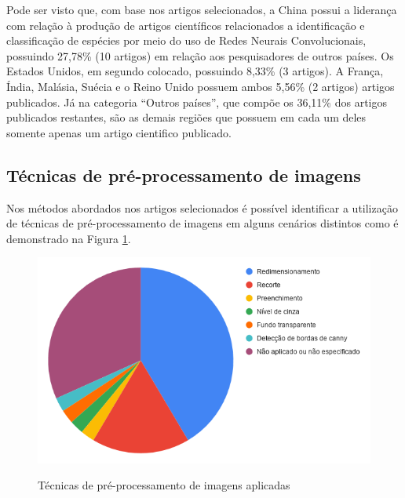 \documentclass[
	12pt,				%
	oneside,			%
	a4paper,			%
	english,			%
	brazil				%
	]{abntex2ppgsi}
\begin{document}
Pode ser visto que, com base nos artigos selecionados, a China possui a liderança com relação à produção de artigos científicos relacionados a identificação e classificação de espécies por meio do uso de Redes Neurais Convolucionais, possuindo 27,78\% (10 artigos) em relação aos pesquisadores de outros países. Os Estados Unidos, em segundo colocado, possuindo 8,33\% (3 artigos). A França, Índia, Malásia, Suécia e o Reino Unido possuem ambos 5,56\% (2 artigos) artigos publicados. Já na categoria ``Outros países'', que compõe os 36,11\% dos artigos publicados restantes, são as demais regiões que possuem em cada um deles somente apenas um artigo cientifico publicado.

\subsection{Técnicas de pré-processamento de imagens}
Nos métodos abordados nos artigos selecionados é possível identificar a utilização de técnicas de pré-processamento de imagens em alguns cenários distintos como é demonstrado na Figura \ref{fig:grafico_preprocessamento_vs_uso}.

\begin{figure}[H]
    \centering
    \caption{Técnicas de pré-processamento de imagens aplicadas}
    \includegraphics[scale=.60]{imagens/revisao_sistematica/grafico_preprocessamento_vs_uso.png}
    \label{fig:grafico_preprocessamento_vs_uso}
\end{figure}
\end{document}

